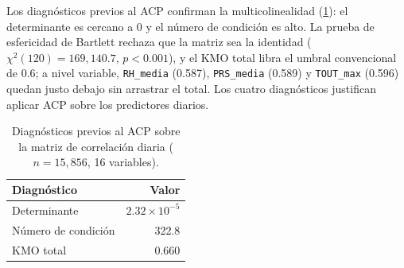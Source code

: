 Los diagnósticos previos al ACP confirman la multicolinealidad
(\cref{tab:diagnostico-pca}): el determinante es cercano a 0 y el número de
condición es alto. La prueba de esfericidad de Bartlett rechaza que la
matriz sea la identidad ($\chi^2(120)=169{,}140.7$, $p<0.001$), y el KMO
total libra el umbral convencional de 0.6; a nivel variable,
\texttt{RH\_media} (0.587), \texttt{PRS\_media} (0.589) y \texttt{TOUT\_max}
(0.596) quedan justo debajo sin arrastrar el total. Los cuatro diagnósticos
justifican aplicar ACP sobre los predictores diarios.

\begin{table}[pos=t]
  \centering
  \caption{Diagnósticos previos al ACP sobre la matriz de correlación
    diaria ($n=15{,}856$, 16 variables).}
  \label{tab:diagnostico-pca}
  \small
  \begin{tabular}{lr}
    \toprule
    Diagnóstico          & Valor \\
    \midrule
    Determinante          & $2.32\times10^{-5}$ \\
    Número de condición   & 322.8 \\
    KMO total             & 0.660 \\
    \bottomrule
  \end{tabular}
\end{table}
